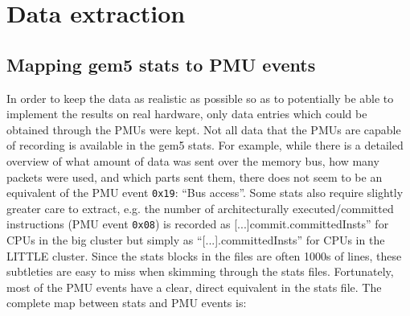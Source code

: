 \section{Data extraction}
    \subsection{Mapping gem5 stats to PMU events}
    In order to keep the data as realistic as possible so as to potentially be 
    able to implement the results on real hardware, only data entries which 
    could be obtained through the PMUs were kept. Not all data that the PMUs 
    are capable of recording is available in the gem5 stats. For example, while 
    there is a detailed overview of what amount of data was sent over the 
    memory bus, how many packets were used, and which parts sent them, there 
    does not seem to be an equivalent of the PMU event \texttt{0x19}: ``Bus 
    access''. Some stats also require slightly greater care to extract, e.g. 
    the number of architecturally executed/committed instructions (PMU event 
    \texttt{0x08}) is recorded as \textsf{[...]commit.committedInsts}'' for 
    CPUs in the big cluster but simply as ``\textsf{[...].committedInsts}'' for 
    CPUs in the LITTLE cluster. Since the stats blocks in the files are often 
    1000s of lines, these subtleties are easy to miss when skimming through the 
    stats files. Fortunately, most of the PMU events have a clear, direct 
    equivalent in the stats file. The complete map between stats and PMU events 
    is:
